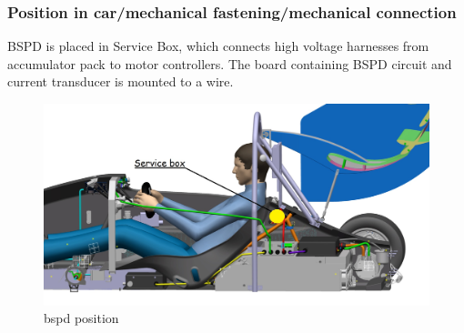 \subsubsection{Position in car/mechanical fastening/mechanical connection}

BSPD is placed in Service Box, which connects high voltage harnesses from accumulator pack to motor controllers. The board containing BSPD circuit and current transducer is mounted to a wire.
\begin{figure}[H]
	\centering
	\includegraphics[width=\textwidth]{./img/ServiceBox-position.jpg}
	\caption{\gls{bspd} position}
	\label{fig:BSPD-position}
\end{figure}
